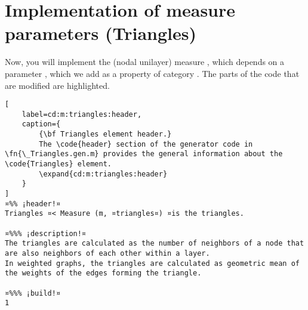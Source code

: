 \documentclass{tufte-handout}
\begin{document}
\clearpage

\section{Implementation of measure parameters (Triangles)}

Now, you will implement the (nodal unilayer) measure , which depends on a parameter , which we add as a property of category .
{%
The parts of the code that are modified are highlighted.
}%

\begin{lstlisting}[
	label=cd:m:triangles:header,
	caption={
		{\bf Triangles element header.}
		The \code{header} section of the generator code in \fn{\_Triangles.gen.m} provides the general information about the \code{Triangles} element.
		\expand{cd:m:triangles:header}
	}
]
¤%% ¡header!¤
Triangles ¤< Measure (m, ¤triangles¤) ¤is the triangles.

¤%%% ¡description!¤
The triangles are calculated as the number of neighbors of a node that are also neighbors of each other within a layer. 
In weighted graphs, the triangles are calculated as geometric mean of the weights of the edges forming the triangle.

¤%%% ¡build!¤
1
\end{lstlisting}
\end{document}

